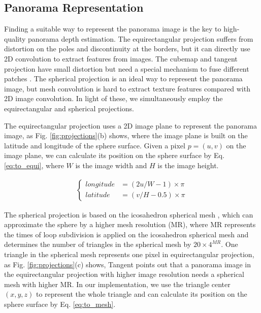 \subsection{Panorama Representation}
\label{sec:represent}

Finding a suitable way to represent the panorama image is the key to high-quality panorama depth estimation. 
The equirectangular projection \cite{zioulis2018omnidepth} suffers from distortion on the poles and discontinuity at the borders, but it can directly use 2D convolution to extract features from images. 
The cubemap and tangent projection have small distortion but need a special mechanism to fuse different patches \cite{li2022omnifusion,shen2022panoformer,peng2022high}. 
The spherical projection \cite{yan2022spheredepth} is an ideal way to represent the panorama image, but mesh convolution is hard to extract texture features compared with 2D image convolution.
In light of these, we simultaneously employ the equirectangular and spherical projections. 

The equirectangular projection uses a 2D image plane to represent the panorama image, as Fig. \ref{fig:projections}(b) shows, where the image plane is built on the latitude and longitude of the sphere surface. Given a pixel $p=(u,v)$ on the image plane, we can calculate its position on the sphere surface by Eq. \ref{eq:to_equi}, where $W$ is the image width and $H$ is the image height. 

\begin{align}
	\label{eq:to_equi}
	\begin{cases}
		longitude &= (2u/W - 1 ) \times \pi \\
		latitude &=( v/H - 0.5 ) \times \pi
	\end{cases}
\end{align}


The spherical projection is based on the icosahedron spherical mesh  \cite{eder2020tangent}, which can approximate the sphere by a higher mesh resolution (MR), where MR represents the times of loop subdivision \cite{hu2021subdivision} is applied on the icosahedron spherical mesh and determines the number of triangles in the spherical mesh by $20 \times 4^{MR}$. 
One triangle in the spherical mesh represents one pixel in equirectangular projection, as Fig. \ref{fig:projections}(c) shows, Tangent \cite{eder2020tangent} points out that a panorama image in the equirectangular projection with higher image resolution needs a spherical mesh with higher MR.
In our implementation, we use the triangle center $(x,y,z)$ to represent the whole triangle and can calculate its position on the sphere surface by Eq. \ref{eq:to_mesh}.


